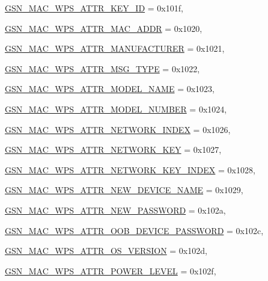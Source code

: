\begin{DoxyCompactItemize}
\par
\hyperlink{a00642_gga0ae19d69a0b381d883890df8a7812414a3830bf83e6e906525b7c4b9fba9a4cf7}{GSN\_\-MAC\_\-WPS\_\-ATTR\_\-KEY\_\-ID} =  0x101f, 
\par
\hyperlink{a00642_gga0ae19d69a0b381d883890df8a7812414ae08e8ebd8144290f405ddd039d50d4a1}{GSN\_\-MAC\_\-WPS\_\-ATTR\_\-MAC\_\-ADDR} =  0x1020, 
\par
\hyperlink{a00642_gga0ae19d69a0b381d883890df8a7812414a56e395ae5ad56ebcdf3a3daf60508705}{GSN\_\-MAC\_\-WPS\_\-ATTR\_\-MANUFACTURER} =  0x1021, 
\par
\hyperlink{a00642_gga0ae19d69a0b381d883890df8a7812414aad2c6f083e5d168e417eaeaec60e1188}{GSN\_\-MAC\_\-WPS\_\-ATTR\_\-MSG\_\-TYPE} =  0x1022, 
\par
\hyperlink{a00642_gga0ae19d69a0b381d883890df8a7812414a00711c771bb3f70aca7c5590d8be46a5}{GSN\_\-MAC\_\-WPS\_\-ATTR\_\-MODEL\_\-NAME} =  0x1023, 
\par
\hyperlink{a00642_gga0ae19d69a0b381d883890df8a7812414a747ceda35756847af00e4c08aa9ddb6b}{GSN\_\-MAC\_\-WPS\_\-ATTR\_\-MODEL\_\-NUMBER} =  0x1024, 
\par
\hyperlink{a00642_gga0ae19d69a0b381d883890df8a7812414a95ce2bb8157589dccf214d78e7bfe089}{GSN\_\-MAC\_\-WPS\_\-ATTR\_\-NETWORK\_\-INDEX} =  0x1026, 
\par
\hyperlink{a00642_gga0ae19d69a0b381d883890df8a7812414a6335ff86b286abd89e8357c3a38e4cfa}{GSN\_\-MAC\_\-WPS\_\-ATTR\_\-NETWORK\_\-KEY} =  0x1027, 
\par
\hyperlink{a00642_gga0ae19d69a0b381d883890df8a7812414ab3412060b43412458c32ae279dafab42}{GSN\_\-MAC\_\-WPS\_\-ATTR\_\-NETWORK\_\-KEY\_\-INDEX} =  0x1028, 
\par
\hyperlink{a00642_gga0ae19d69a0b381d883890df8a7812414a53315d91cf0bccd56a5df8903b4b1e3c}{GSN\_\-MAC\_\-WPS\_\-ATTR\_\-NEW\_\-DEVICE\_\-NAME} =  0x1029, 
\par
\hyperlink{a00642_gga0ae19d69a0b381d883890df8a7812414a63fe81cf6d0077c4dd62fdf2397f628f}{GSN\_\-MAC\_\-WPS\_\-ATTR\_\-NEW\_\-PASSWORD} =  0x102a, 
\par
\hyperlink{a00642_gga0ae19d69a0b381d883890df8a7812414a4a27af7c5d1724ce0f641ac86d401f86}{GSN\_\-MAC\_\-WPS\_\-ATTR\_\-OOB\_\-DEVICE\_\-PASSWORD} =  0x102c, 
\par
\hyperlink{a00642_gga0ae19d69a0b381d883890df8a7812414a248764365b811e501fa52e7175fd15f1}{GSN\_\-MAC\_\-WPS\_\-ATTR\_\-OS\_\-VERSION} =  0x102d, 
\par
\hyperlink{a00642_gga0ae19d69a0b381d883890df8a7812414a759d95dbbd54effd023e9c7dac8e5ccc}{GSN\_\-MAC\_\-WPS\_\-ATTR\_\-POWER\_\-LEVEL} =  0x102f, 

\end{DoxyCompactItemize}
